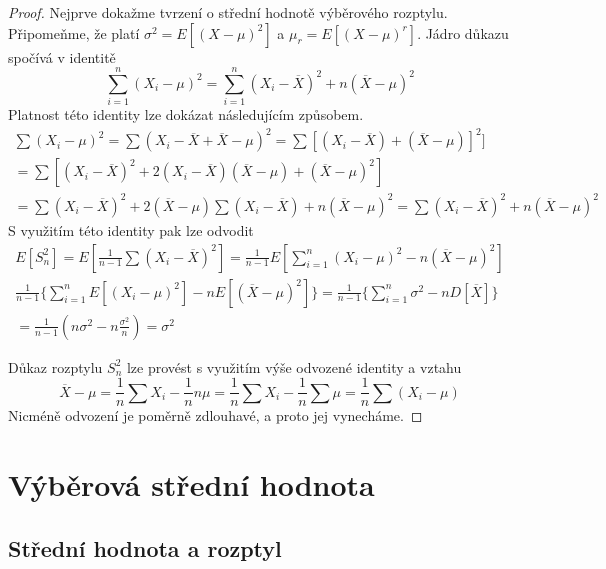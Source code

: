 \begin{proof}
Nejprve dokažme tvrzení o střední hodnotě výběrového rozptylu. Připomeňme, že platí $\sigma^2 = E[(X - \mu)^2]$ a $\mu_r = E[(X - \mu)^r]$. Jádro důkazu spočívá v identitě
\begin{equation*}
\sum_{i = 1}^n (X_i - \mu)^2 = \sum_{i = 1}^n (X_i - \overline{X})^2 + n (\overline{X} - \mu)^2
\end{equation*}
Platnost této identity lze dokázat následujícím způsobem.
\begin{gather*}
\sum(X_i - \mu)^2 = \sum(X_i - \overline{X} + \overline{X} - \mu)^2 = \sum [(X_i - \overline{X}) + (\overline{X} - \mu)]^2]\\
= \sum[(X_i - \overline{X})^2 + 2(X_i - \overline{X})(\overline{X} - \mu) + (\overline{X} - \mu)^2]\\
= \sum(X_i - \overline{X})^2 + 2(\overline{X} - \mu)\sum(X_i - \overline{X}) + n (\overline{X} - \mu)^2
= \sum(X_i - \overline{X})^2 + n(\overline{X} - \mu)^2
\end{gather*}
S využitím této identity pak lze odvodit
\begin{gather*}
E[S_n^2] = E \left[\frac{1}{n - 1} \sum (X_i - \overline{X})^2 \right] = \frac{1}{n - 1} E \left[\sum_{i = 1}^n (X_i - \mu)^2 - n(\overline{X} - \mu)^2 \right]\\
\frac{1}{n - 1} \Big\{\sum_{i = 1}^n E[(X_i - \mu)^2] - n E[(\overline{X} - \mu)^2] \Big\} = \frac{1}{n - 1}\Big\{\sum_{i = 1}^n \sigma^2 - n D[\overline{X}] \Big\}\\
= \frac{1}{n - 1}\left(n \sigma^2 - n \frac{\sigma^2}{n} \right) = \sigma^2
\end{gather*}

Důkaz rozptylu $S_n^2$ lze provést s využitím výše odvozené identity a vztahu
\begin{equation*}
\overline{X} - \mu = \frac{1}{n} \sum X_i - \frac{1}{n} n \mu = \frac{1}{n} \sum X_i - \frac{1}{n} \sum \mu = \frac{1}{n} \sum (X_i - \mu)
\end{equation*}
Nicméně odvození je poměrně zdlouhavé, a proto jej vynecháme.
\end{proof}

\section{Výběrová střední hodnota}

\subsection{Střední hodnota a rozptyl}

